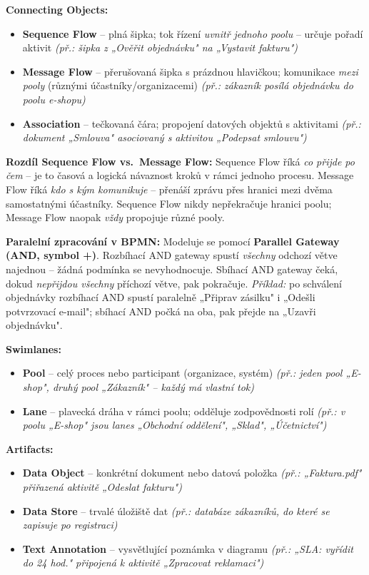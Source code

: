 \textbf{Connecting Objects:}
\begin{itemize}
  \item \textbf{Sequence Flow} -- plná šipka; tok řízení \textit{uvnitř jednoho poolu} -- určuje pořadí aktivit \textit{(př.: šipka z „Ověřit objednávku" na „Vystavit fakturu")}
  \item \textbf{Message Flow} -- přerušovaná šipka s prázdnou hlavičkou; komunikace \textit{mezi pooly} (různými účastníky/organizacemi) \textit{(př.: zákazník posílá objednávku do poolu e-shopu)}
  \item \textbf{Association} -- tečkovaná čára; propojení datových objektů s aktivitami \textit{(př.: dokument „Smlouva" asociovaný s aktivitou „Podepsat smlouvu")}
\end{itemize}

\textbf{Rozdíl Sequence Flow vs.\ Message Flow:}
Sequence Flow říká \textit{co přijde po čem} -- je to časová a logická návaznost kroků v rámci jednoho procesu.
Message Flow říká \textit{kdo s kým komunikuje} -- přenáší zprávu přes hranici mezi dvěma samostatnými účastníky.
Sequence Flow nikdy nepřekračuje hranici poolu; Message Flow naopak \textit{vždy} propojuje různé pooly.

\textbf{Paralelní zpracování v BPMN:}
Modeluje se pomocí \textbf{Parallel Gateway (AND, symbol +)}.
Rozbíhací AND gateway spustí \textit{všechny} odchozí větve najednou -- žádná podmínka se nevyhodnocuje.
Sbíhací AND gateway čeká, dokud \textit{nepřijdou všechny} příchozí větve, pak pokračuje.
\textit{Příklad:} po schválení objednávky rozbíhací AND spustí paralelně „Připrav zásilku" i „Odešli potvrzovací e-mail"; sbíhací AND počká na oba, pak přejde na „Uzavři objednávku".

\textbf{Swimlanes:}
\begin{itemize}
  \item \textbf{Pool} -- celý proces nebo participant (organizace, systém) \textit{(př.: jeden pool „E-shop", druhý pool „Zákazník" -- každý má vlastní tok)}
  \item \textbf{Lane} -- plavecká dráha v rámci poolu; odděluje zodpovědnosti rolí \textit{(př.: v poolu „E-shop" jsou lanes „Obchodní oddělení", „Sklad", „Účetnictví")}
\end{itemize}

\textbf{Artifacts:}
\begin{itemize}
  \item \textbf{Data Object} -- konkrétní dokument nebo datová položka \textit{(př.: „Faktura.pdf" přiřazená aktivitě „Odeslat fakturu")}
  \item \textbf{Data Store} -- trvalé úložiště dat \textit{(př.: databáze zákazníků, do které se zapisuje po registraci)}
  \item \textbf{Text Annotation} -- vysvětlující poznámka v diagramu \textit{(př.: „SLA: vyřídit do 24 hod." připojená k aktivitě „Zpracovat reklamaci")}
\end{itemize}

